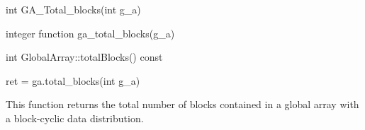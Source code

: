 \documentclass[10pt]{article}
\begin{document}


\begin{capi}
\begin{ccode}
int GA_Total_blocks(int g_a)
\end{ccode}
\begin{funcargs}
\end{funcargs}
\end{capi}

\begin{fapi}
\begin{fcode}
integer function ga_total_blocks(g_a)
\end{fcode}
\begin{funcargs}
\end{funcargs}
\end{fapi}

\begin{cxxapi}
\begin{cxxcode}
int GlobalArray::totalBlocks() const
\end{cxxcode}
\begin{funcargs}
\end{funcargs}
\end{cxxapi}

\begin{pyapi}
\begin{pycode}
ret = ga.total_blocks(int g_a)
\end{pycode}
\begin{funcargs}
\end{funcargs}
\end{pyapi}

\local

\begin{desc}

This function returns the total number of blocks contained in a global array
with a block-cyclic data distribution.

\end{desc}
\end{document}
